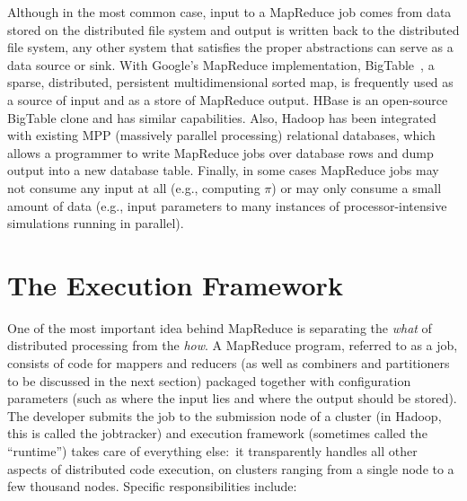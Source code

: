 Although in the most common case, input to a MapReduce job comes from
data stored on the distributed file system and output is written back
to the distributed file system, any other system that satisfies the
proper abstractions can serve as a data source or sink.  With Google's
MapReduce implementation, BigTable~\cite{ChangFay_etal_OSDI2006}, a
sparse, distributed, persistent multidimensional sorted map, is
frequently used as a source of input and as a store of MapReduce
output.  HBase is an open-source BigTable clone and has similar
capabilities.  Also, Hadoop has been integrated with existing MPP
(massively parallel processing) relational databases, which allows a
programmer to write MapReduce jobs over database rows and dump output
into a new database table.  Finally, in some cases MapReduce jobs may
not consume any input at all (e.g., computing $\pi$) or may only
consume a small amount of data (e.g., input parameters to many
instances of processor-intensive simulations running in parallel).

\section{The Execution Framework}
\label{chapter2:execution-framework}

One of the most important idea behind MapReduce is separating the {\it
what} of distributed processing from the {\it how}.  A MapReduce
program, referred to as a job, consists of code for mappers and
reducers (as well as combiners and partitioners to be discussed in the
next section) packaged together with configuration parameters (such as
where the input lies and where the output should be stored).  The
developer submits the job to the submission node of a cluster (in
Hadoop, this is called the jobtracker) and execution framework
(sometimes called the ``runtime'') takes care of everything else:\ it
transparently handles all other aspects of distributed code execution,
on clusters ranging from a single node to a few thousand nodes.
Specific responsibilities include:

